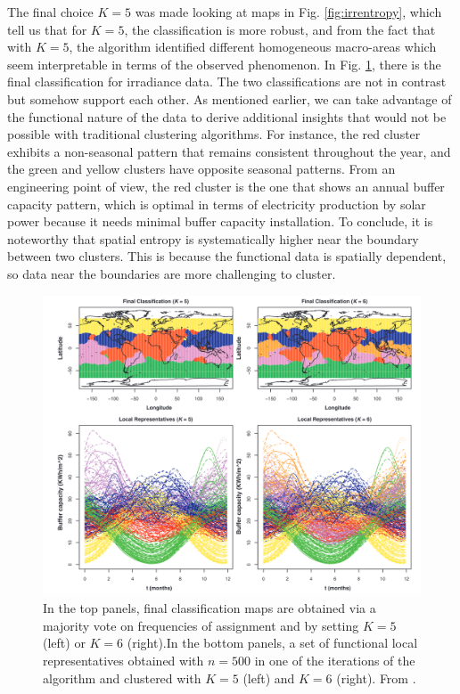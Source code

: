 The final choice $K=5$ was made looking at maps in Fig. \ref{fig:irrentropy}, which tell us that for $K=5$, the classification is more robust, and from the fact that with $K=5$, the algorithm identified different homogeneous macro-areas which seem interpretable in terms of the observed phenomenon. In Fig. \ref{fig:resbagging}, there is the final classification for irradiance data. The two classifications are not in contrast but somehow support each other. As mentioned earlier, we can take advantage of the functional nature of the data to derive additional insights that would not be possible with traditional clustering algorithms. For instance, the red cluster exhibits a non-seasonal pattern that remains consistent throughout the year, and the green and yellow clusters have opposite seasonal patterns. From an engineering point of view, the red cluster is the one that shows an annual buffer capacity pattern, which is optimal in terms of electricity production by solar power because it needs minimal buffer capacity installation. %
To conclude, it is noteworthy that spatial entropy is systematically higher near the boundary between two clusters. This is because the functional data is spatially dependent, so data near the boundaries are more challenging to cluster.
\begin{figure}
    \centering
    \includegraphics[scale=0.3]{Images/resbagging.png}
    \caption[Classification of irradiance data.]{In the top panels, final classification maps are obtained via a majority vote on frequencies of assignment and by setting $K = 5$ (left) or $K = 6$ (right).In the bottom panels, a set of functional local representatives obtained with $n = 500$ in one of the iterations of the algorithm and clustered with $K = 5$ (left) and $K=6$ (right). From \citeauthor{secchi_bagging_2013} \citeyear{secchi_bagging_2013}.}
    \label{fig:resbagging}
\end{figure}

